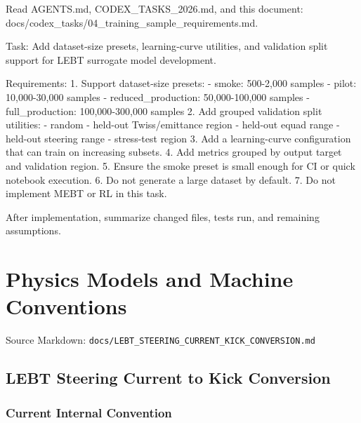 \documentclass[
]{article}
\newenvironment{Shaded}{}{}
\newcommand{\NormalTok}[1]{#1}
\begin{document}
\begin{Shaded}
\begin{Highlighting}[]
\NormalTok{Read AGENTS.md, CODEX\_TASKS\_2026.md, and this document:}
\NormalTok{docs/codex\_tasks/04\_training\_sample\_requirements.md.}

\NormalTok{Task:}
\NormalTok{Add dataset{-}size presets, learning{-}curve utilities, and validation split}
\NormalTok{support for LEBT surrogate model development.}

\NormalTok{Requirements:}
\NormalTok{1. Support dataset{-}size presets:}
\NormalTok{   {-} smoke: 500{-}2,000 samples}
\NormalTok{   {-} pilot: 10,000{-}30,000 samples}
\NormalTok{   {-} reduced\_production: 50,000{-}100,000 samples}
\NormalTok{   {-} full\_production: 100,000{-}300,000 samples}
\NormalTok{2. Add grouped validation split utilities:}
\NormalTok{   {-} random}
\NormalTok{   {-} held{-}out Twiss/emittance region}
\NormalTok{   {-} held{-}out equad range}
\NormalTok{   {-} held{-}out steering range}
\NormalTok{   {-} stress{-}test region}
\NormalTok{3. Add a learning{-}curve configuration that can train on increasing subsets.}
\NormalTok{4. Add metrics grouped by output target and validation region.}
\NormalTok{5. Ensure the smoke preset is small enough for CI or quick notebook execution.}
\NormalTok{6. Do not generate a large dataset by default.}
\NormalTok{7. Do not implement MEBT or RL in this task.}

\NormalTok{After implementation, summarize changed files, tests run, and remaining assumptions.}
\end{Highlighting}
\end{Shaded}

\hypertarget{physics-models-and-machine-conventions}{%
\section{Physics Models and Machine
Conventions}\label{physics-models-and-machine-conventions}}

Source Markdown:
\texttt{docs/LEBT\_STEERING\_CURRENT\_KICK\_CONVERSION.md}

\hypertarget{lebt-steering-current-to-kick-conversion}{%
\subsection{LEBT Steering Current to Kick
Conversion}\label{lebt-steering-current-to-kick-conversion}}

\hypertarget{current-internal-convention}{%
\subsubsection{Current Internal
Convention}\label{current-internal-convention}}
\end{document}
